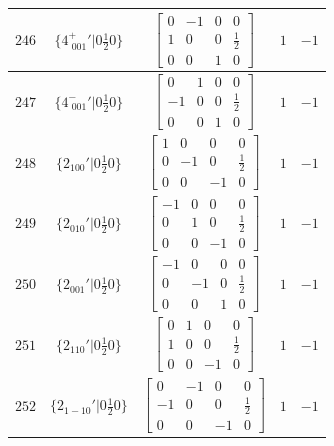 \documentclass[fleqn,8pt]{jsarticle}
\begin{document}
\begin{longtable}{ccccc}
$ 246 $ & $ \{4^{+}_{\,\,001}{}'|0 \frac{1}{2} 0\} $ & $ \begin{bmatrix} 0 & -1 & 0 & 0 \\ 1 & 0 & 0 & \frac{1}{2} \\ 0 & 0 & 1 & 0 \end{bmatrix} $ & $ 1 $ & $ -1 $ \\ \hline
$ 247 $ & $ \{4^{-}_{\,\,001}{}'|0 \frac{1}{2} 0\} $ & $ \begin{bmatrix} 0 & 1 & 0 & 0 \\ -1 & 0 & 0 & \frac{1}{2} \\ 0 & 0 & 1 & 0 \end{bmatrix} $ & $ 1 $ & $ -1 $ \\ \hline
$ 248 $ & $ \{2{}_{100}{}'|0 \frac{1}{2} 0\} $ & $ \begin{bmatrix} 1 & 0 & 0 & 0 \\ 0 & -1 & 0 & \frac{1}{2} \\ 0 & 0 & -1 & 0 \end{bmatrix} $ & $ 1 $ & $ -1 $ \\ \hline
$ 249 $ & $ \{2{}_{010}{}'|0 \frac{1}{2} 0\} $ & $ \begin{bmatrix} -1 & 0 & 0 & 0 \\ 0 & 1 & 0 & \frac{1}{2} \\ 0 & 0 & -1 & 0 \end{bmatrix} $ & $ 1 $ & $ -1 $ \\ \hline
$ 250 $ & $ \{2{}_{001}{}'|0 \frac{1}{2} 0\} $ & $ \begin{bmatrix} -1 & 0 & 0 & 0 \\ 0 & -1 & 0 & \frac{1}{2} \\ 0 & 0 & 1 & 0 \end{bmatrix} $ & $ 1 $ & $ -1 $ \\ \hline
$ 251 $ & $ \{2{}_{110}{}'|0 \frac{1}{2} 0\} $ & $ \begin{bmatrix} 0 & 1 & 0 & 0 \\ 1 & 0 & 0 & \frac{1}{2} \\ 0 & 0 & -1 & 0 \end{bmatrix} $ & $ 1 $ & $ -1 $ \\ \hline
$ 252 $ & $ \{2{}_{1-10}{}'|0 \frac{1}{2} 0\} $ & $ \begin{bmatrix} 0 & -1 & 0 & 0 \\ -1 & 0 & 0 & \frac{1}{2} \\ 0 & 0 & -1 & 0 \end{bmatrix} $ & $ 1 $ & $ -1 $ \\ \hline

\end{longtable}
\end{document}
